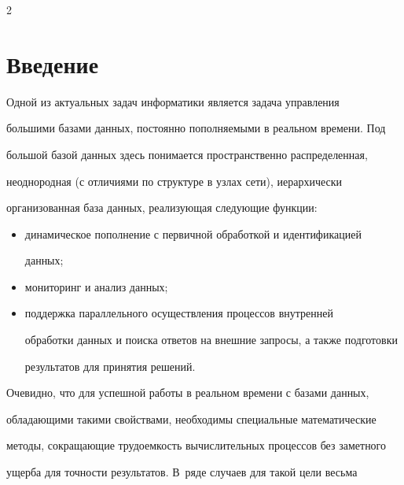       \begin{multicols}{2}





            \label{st\stat}        





\section{Введение}





  Одной из актуальных задач информатики является задача управления 


большими базами данных, постоянно пополняемыми в реальном времени. Под 


большой базой данных здесь понимается пространственно распределенная, 


неоднородная (с отличиями по структуре в узлах сети), иерархически 


организованная база данных, реализующая следующие функции: 


  \begin{itemize}


  \item  динамическое пополнение с первичной обработкой и идентификацией 


данных;


  \item мониторинг и анализ данных;


  \item поддержка параллельного осуществления процессов внутренней 


обработки данных и поиска ответов на внешние запросы, а также подготовки 


результатов для принятия решений.


  \end{itemize}


  


  Очевидно, что для успешной работы в реальном времени с базами данных, 


обладающими такими свойствами, необходимы специальные математические 


методы, сокращающие трудоемкость вы\-чис\-ли\-тель\-ных процессов без заметного 


ущерба для точности результатов. В~ряде случаев для такой цели весьма 



\end{multicols}
